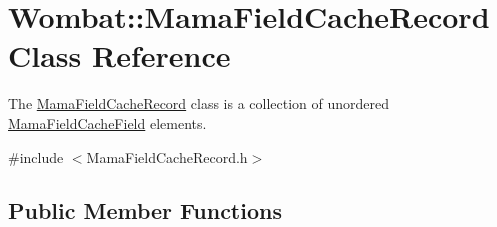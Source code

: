 \hypertarget{classWombat_1_1MamaFieldCacheRecord}{
\section{Wombat::MamaFieldCacheRecord Class Reference}
\label{classWombat_1_1MamaFieldCacheRecord}
}


The {\ttfamily \hyperlink{classWombat_1_1MamaFieldCacheRecord}{MamaFieldCacheRecord}} class is a collection of unordered {\ttfamily \hyperlink{classWombat_1_1MamaFieldCacheField}{MamaFieldCacheField}} elements.  


{\ttfamily \#include $<$MamaFieldCacheRecord.h$>$}\subsection*{Public Member Functions}
